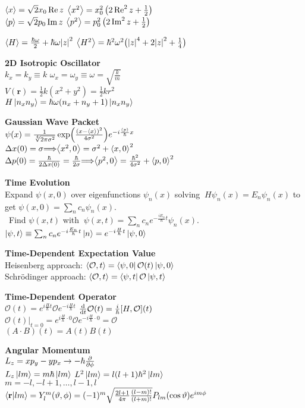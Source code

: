 \documentclass[11pt, a4paper]{article}
\newcommand{\newsec}[1]{\vspace{2mm}\textbf{#1}\\}
\renewcommand{\vec}[1]{\bm{#1}} %
\let\spaceyimplies\implies
\renewcommand{\implies}{\hspace{-1mm}\spaceyimplies\hspace{-1mm}}
\renewcommand{\O}{\mathcal{O}}  %
\newcommand{\tev}{e^{-i\frac{H}{\hbar}t}}  %
\newcommand{\tevp}{e^{i\frac{H}{\hbar}t}}  %
\begin{document}
\begin{multicols}{2}
$ \ev{x} = \sqrt{2} x_{0}\Re z $ \qquad $ \ev{x^{2}}  = x_{0}^{2}\left(2 \Re^{2}z + \tfrac{1}{2}\right) $\\
$ \ev{p} = \sqrt{2}p_{0}\Im z $ \qquad $ \ev{p^{2}} = p_{0}^{2}\left(2 \Im^{2}z + \tfrac{1}{2}\right) $

$ \ev{H} = \frac{\hbar \omega}{2} + \hbar \omega \abs{z}^{2} $ \quad $ \ev{H^{2}} = \hbar^{2} \omega^{2} \big(\abs{z}^{4} + 2\abs{z}^{2} + \tfrac{1}{4}\big) $


\newsec{2D Isotropic Oscillator}
$ k_{x} = k_{y} \equiv k $ \quad  $ \omega_{x} = \omega_{y} \equiv \omega = \sqrt{\frac{k}{m}}$\\
$ V(\vec{r}) = \frac{1}{2}k(x^{2} + y^{2}) = \frac{1}{2}kr^{2} $\\
$ H\ket{n_{x}n_{y}} = \hbar \omega (n_{x} + n_{y} + 1)\ket{n_{x}n_{y}} $


\newsec{Gaussian Wave Packet}
$ \psi(x) = \frac{1}{\sqrt[4]{2\pi \sigma^{2}}} \exp(\frac{(x - \ev{x})^{2}}{4 \sigma^{2}})e^{-i\frac{\ev{p}}{\hbar}x} $\\
$ \Delta x(0) = \sigma \implies \ev{x^{2}, 0} = \sigma^{2} + \ev{x, 0}^{2} $\\
$ \Delta p(0) = \frac{\hbar}{2\Delta x(0)} = \frac{\hbar}{2\sigma} \implies \ev{p^{2}, 0} = \frac{\hbar^{2}}{4\sigma^{2}} + \ev{p, 0}^{2} $

\newsec{Time Evolution}
Expand $ \psi(x, 0) $ over eigenfunctions $ \psi_{n}(x) $ solving
${} \ H \psi_{n}(x) = E_{n}\psi_{n}(x) $ to get $ \psi(x, 0) = \sum_{n} c_{n} \psi_{n}(x) $. \\[1mm]
\null \ Find $ \psi(x, t) $ with ${} \ \psi(x, t) = \sum_{n} c_{n}e^{-\frac{iE_{n}}{\hbar}t}\psi_{n}(x) $.\\
$ \ket{\psi, t} \equiv \sum_{n} c_{n}e^{-i \frac{E_{n}}{\hbar}t}\ket{n} = e^{-i\frac{H}{\hbar}t}\ket{\psi, 0} $

\newsec{Time-Dependent Expectation Value}
Heisenberg approach: $ \ev{\O, t} = \bra{\psi, 0} \O(t) \ket{\psi, 0} $\\
Schr\"{o}dinger approach: $ \ev{\O, t} = \bra{\psi, t} \O \ket{\psi, t} $

\newsec{Time-Dependent Operator}
$ \O(t) = \tevp \O \tev $ \qquad $ \dv{t}\O(t) = \frac{i}{\hbar}[H, \O](t) $\\
$ \O(t)\big |_{t = 0} = e^{i\frac{H}{\hbar}\cdot 0}\O e^{-i\frac{H}{\hbar}\cdot 0} = \O $\\
$ (A\cdot B)(t) = A(t) B(t) $

\newsec{Angular Momentum}
$ L_{z} = xp_{y} - yp_{x} \to - \hbar \pdv{\phi}$\\
$L_z \ket{lm} = m \hbar \ket{lm}$ \qquad $L^2 \ket{lm} = l(l+1)\hbar^2 \ket{lm}$ \\
$m = -l, -l + 1, \dots, l - 1, l$ \\
$\braket{\vb r}{lm} = Y_l^m(\vartheta, \phi) = (-1)^m \sqrt{\frac{2l + 1}{4 \pi} \frac{(l-m)!}{(l + m)!}} P_{lm}(\cos \vartheta) e^{i m \phi}$\\


\end{multicols}
\end{document}
